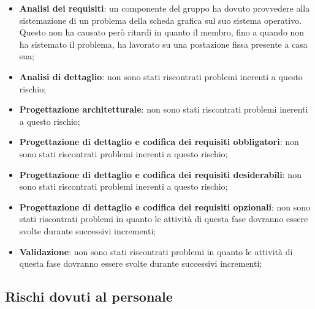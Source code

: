 			\begin{itemize}
				\item \textbf{Analisi dei requisiti}: un componente del gruppo ha dovuto provvedere alla sistemazione di un problema della scheda grafica sul suo sistema operativo. \newline
				Questo non ha causato però ritardi in quanto il membro, fino a quando non ha sistemato il problema, ha lavorato su una postazione fissa presente a casa sua;
				\item \textbf{Analisi di dettaglio}: non sono stati riscontrati problemi inerenti a questo rischio;
				\item \textbf{Progettazione architetturale}: non sono stati riscontrati problemi inerenti a questo rischio;
				\item \textbf{Progettazione di dettaglio e codifica dei requisiti obbligatori}: non sono stati riscontrati problemi inerenti a questo rischio;
				\item \textbf{Progettazione di dettaglio e codifica dei requisiti desiderabili}: non sono stati riscontrati problemi inerenti a questo rischio;
				\item \textbf{Progettazione di dettaglio e codifica dei requisiti opzionali}: non sono stati riscontrati problemi in quanto le attività di questa fase dovranno essere svolte durante successivi incrementi;
				\item \textbf{Validazione}: non sono stati riscontrati problemi in quanto le attività di questa fase dovranno essere svolte durante successivi incrementi;
			\end{itemize}


	
	\subsection{Rischi dovuti al personale} %
	\label{sub:rischi_dovuti_al_personale}
